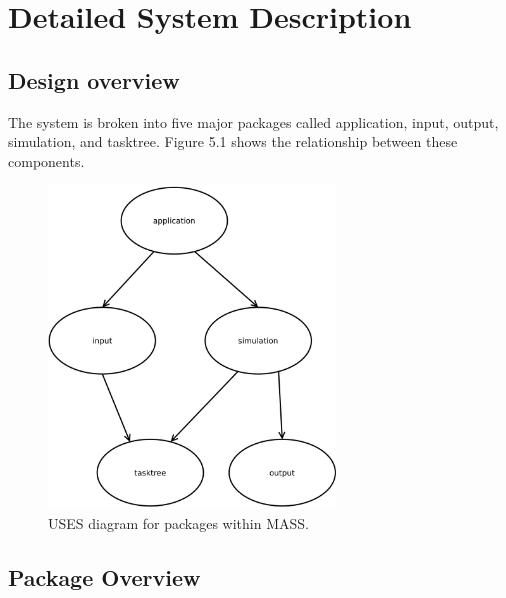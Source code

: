 \chapter{Detailed System Description}\label{detailedSystemDescription}

\section{Design overview}

The system is broken into five major packages called application, input, output, simulation, and tasktree. Figure 5.1 shows the relationship between these components.

\begin{figure}[H]
\centering
\includegraphics[trim=0.5cm 0.5cm 0.5cm 0.5cm,width=3.0in]{figs/packageUSES}
\caption{USES diagram for packages within MASS.}
\label{fig:UsesDiagram }
\end{figure}

\section{Package Overview}

